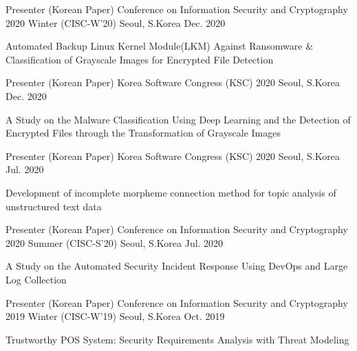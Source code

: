 

\begin{cventries}

\cventry
  {Presenter (Korean Paper)} %
  {Conference on Information Security and Cryptography 2020 Winter (CISC-W'20)} %
  {Seoul, S.Korea} %
  {Dec. 2020} %
  {
    \begin{cvitems}
      \item {Automated Backup Linux Kernel Module(LKM) Against Ransomware \& Classification of Grayscale Images for Encrypted File Detection}
    \end{cvitems}
  }

\cventry
  {Presenter (Korean Paper)} %
  {Korea Software Congress (KSC) 2020} %
  {Seoul, S.Korea} %
  {Dec. 2020} %
  {
    \begin{cvitems}
      \item {A Study on the Malware Classification Using Deep Learning and the Detection of Encrypted Files through the Transformation of Grayscale Images}
    \end{cvitems}
  }

\cventry
  {Presenter (Korean Paper)} %
  {Korea Software Congress (KSC) 2020} %
  {Seoul, S.Korea} %
  {Jul. 2020} %
  {
    \begin{cvitems}
      \item {Development of incomplete morpheme connection method for topic analysis of unstructured text data}
    \end{cvitems}
  }

\cventry
  {Presenter (Korean Paper)} %
  {Conference on Information Security and Cryptography 2020 Summer (CISC-S'20)} %
  {Seoul, S.Korea} %
  {Jul. 2020} %
  {
    \begin{cvitems}
      \item {A Study on the Automated Security Incident Response Using DevOps and Large Log Collection}
    \end{cvitems}
  }

\cventry
  {Presenter (Korean Paper)} %
  {Conference on Information Security and Cryptography 2019 Winter (CISC-W'19)} %
  {Seoul, S.Korea} %
  {Oct. 2019} %
  {
    \begin{cvitems}
      \item {Trustworthy POS System: Security Requirements Analysis with Threat Modeling}
    \end{cvitems}
  }

\end{cventries}